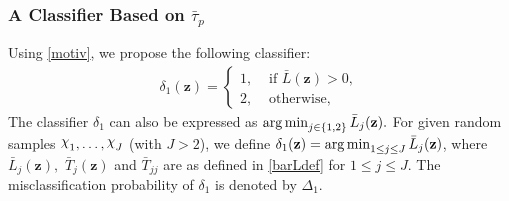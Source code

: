 \documentclass[twoside]{article}
\newcommand{\bz}{\mathbf{z}}
\newcommand{\0}{\mathbf{0}}
\newcommand{\1}{\mathbf{1}}
\DeclareRobustCommand{\rchi}{{\mathpalette\irchi\relax}}
\newcommand{\irchi}[2]{\raisebox{\depth}{$#1\chi$}} %
\newcommand{\argmin}{\operatornamewithlimits{arg\,min}}
\numberwithin{equation}{section}
\begin{document}
\subsubsection{A Classifier Based on $\bar{\tau}_p$}\label{method.taubar}
Using \eqref{motiv}, we propose the following classifier:
\begin{align}\label{delta1def}
 \delta_1(\bz)=\begin{cases}
                1,& \text{ if }\bar{L}(\bz)>0,\\
                2,& \text{ otherwise,}
               \end{cases}
\end{align}
The classifier $\delta_1$ can also be expressed as $\argmin_{j\in\{1,2\}}\bar{L}_j(\bz).$ For given random samples $\rchi_1, \ldots, \rchi_J$ (with $J>2$), we define $ \delta_1(\bz)=\argmin_{1\leq j\leq J}\bar{L}_j(\bz)$, where $\bar{L}_j(\bz),$ $\bar{T}_j(\bz)$ and $\bar{T}_{jj}$ are as defined in \eqref{barLdef} for $1\le j\le J$. The misclassification probability of $\delta_1$ is denoted by $\Delta_1$.
\end{document}

